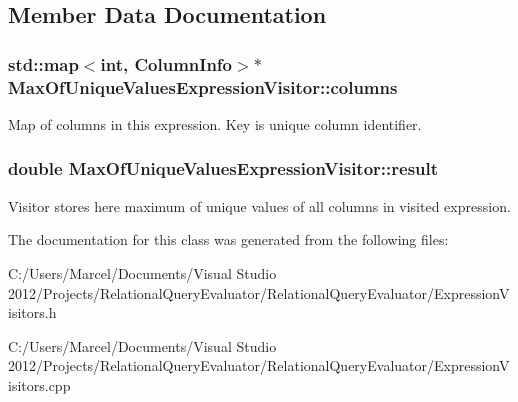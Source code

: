 \subsection{Member Data Documentation}
\hypertarget{class_max_of_unique_values_expression_visitor_a1f0ca5cd4e5fd0eb513fa64ea21ecae6}{
\subsubsection[{columns}]{\setlength{\rightskip}{0pt plus 5cm}std\+::map$<$int, {\bf Column\+Info}$>$$\ast$ Max\+Of\+Unique\+Values\+Expression\+Visitor\+::columns}}\label{class_max_of_unique_values_expression_visitor_a1f0ca5cd4e5fd0eb513fa64ea21ecae6}
Map of columns in this expression. Key is unique column identifier. \hypertarget{class_max_of_unique_values_expression_visitor_a4d1359a778ac14a3709c63bff3a01383}{
\subsubsection[{result}]{\setlength{\rightskip}{0pt plus 5cm}double Max\+Of\+Unique\+Values\+Expression\+Visitor\+::result}}\label{class_max_of_unique_values_expression_visitor_a4d1359a778ac14a3709c63bff3a01383}
Visitor stores here maximum of unique values of all columns in visited expression. 

The documentation for this class was generated from the following files\+:\begin{DoxyCompactItemize}
\item 
C\+:/\+Users/\+Marcel/\+Documents/\+Visual Studio 2012/\+Projects/\+Relational\+Query\+Evaluator/\+Relational\+Query\+Evaluator/Expression\+Visitors.\+h\item 
C\+:/\+Users/\+Marcel/\+Documents/\+Visual Studio 2012/\+Projects/\+Relational\+Query\+Evaluator/\+Relational\+Query\+Evaluator/Expression\+Visitors.\+cpp\end{DoxyCompactItemize}
